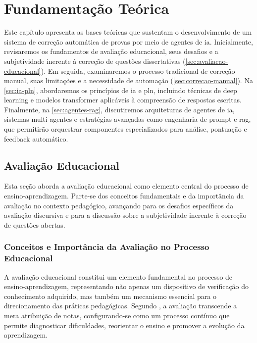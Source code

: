 \chapter{Fundamentação Teórica}
\label{cap:fundamentacao}

Este capítulo apresenta as bases teóricas que sustentam o desenvolvimento de um sistema de correção automática de provas por meio de agentes de \gls{ia}. Inicialmente, revisaremos os fundamentos de avaliação educacional, seus desafios e a subjetividade inerente à correção de questões dissertativas (\autoref{sec:avaliacao-educacional}). Em seguida, examinaremos o processo tradicional de correção manual, suas limitações e a necessidade de automação (\autoref{sec:correcao-manual}). Na \autoref{sec:ia-pln}, abordaremos os princípios de \gls{ia} e \gls{pln}, incluindo técnicas de deep learning e modelos transformer aplicáveis à compreensão de respostas escritas. Finalmente, na \autoref{sec:agentes-rag}, discutiremos arquiteturas de agentes de \gls{ia}, sistemas multi‑agentes e estratégias avançadas como engenharia de prompt e \gls{rag}, que permitirão orquestrar componentes especializados para análise, pontuação e feedback automático.  

\section{Avaliação Educacional}
\label{sec:avaliacao-educacional}

Esta seção aborda a avaliação educacional como elemento central do processo de ensino-aprendizagem. Parte-se dos conceitos fundamentais e da importância da avaliação no contexto pedagógico, avançando para os desafios específicos da avaliação discursiva e para a discussão sobre a subjetividade inerente à correção de questões abertas.

\subsection{Conceitos e Importância da Avaliação no Processo Educacional}

A avaliação educacional constitui um elemento fundamental no processo de ensino-aprendizagem, representando não apenas um dispositivo de verificação do conhecimento adquirido, mas também um mecanismo essencial para o direcionamento das práticas pedagógicas. Segundo , a avaliação transcende a mera atribuição de notas, configurando-se como um processo contínuo que permite diagnosticar dificuldades, reorientar o ensino e promover a evolução da aprendizagem.

